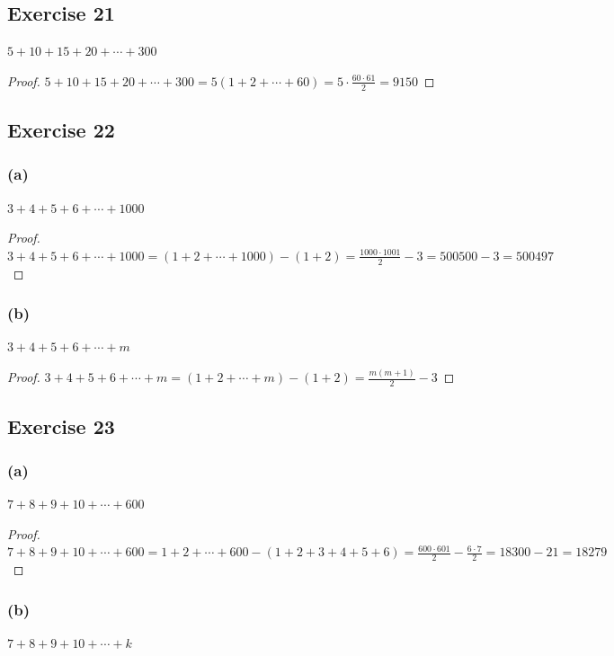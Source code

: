 \documentclass[14pt]{extarticle}
\newcommand{\dps}{\displaystyle}
\begin{document}
\subsection{Exercise 21}
$5 + 10 + 15 + 20 + \cdots + 300$

\begin{proof}
$\dps 5 + 10 + 15 + 20 + \cdots + 300 = 5(1+2+\cdots+60) = 5 \cdot \frac{60 \cdot 61}{2} = 9150$
\end{proof}

\subsection{Exercise 22}
\subsubsection{(a)}
$3 + 4 + 5 + 6 + \cdots + 1000$

\begin{proof}
$\dps 3 + 4 + 5 + 6 + \cdots + 1000 = (1+2+\cdots+1000) - (1+2) = \frac{1000 \cdot 1001}{2} - 3 = 500500-3 = 500497$
\end{proof}

\subsubsection{(b)}
$3 + 4 + 5 + 6 + \cdots + m$

\begin{proof}
$\dps 3 + 4 + 5 + 6 + \cdots + m = (1+2+\cdots+m) - (1+2) = \frac{m(m+1)}{2} - 3$
\end{proof}

\subsection{Exercise 23}
\subsubsection{(a)}
$7 + 8 + 9 + 10 + \cdots + 600$

\begin{proof}
$\dps 7 + 8 + 9 + 10 + \cdots + 600 = 1 + 2 + \cdots + 600 - (1+2+3+4+5+6) = \frac{600 \cdot 601}{2} - \frac{6 \cdot 7}{2} = 18300 - 21 = 18279$
\end{proof}

\subsubsection{(b)}
$7 + 8 + 9 + 10 + \cdots + k$
\end{document}
